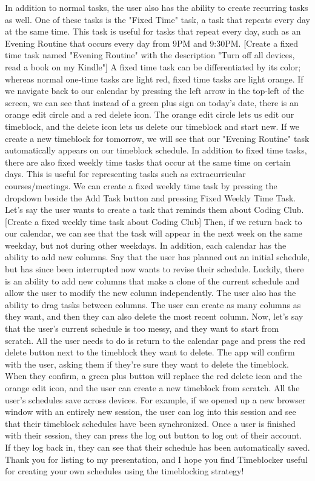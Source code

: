 \documentclass[notitlepage]{report}
\begin{document}
In addition to normal tasks, the user also has the ability to create recurring tasks as well. One of these tasks is the "Fixed Time" task, a task that repeats every day at the same time. This task is useful for tasks that repeat every day, such as an Evening Routine that occurs every day from 9PM and 9:30PM.
[Create a fixed time task named "Evening Routine" with the description "Turn off all devices, read a book on my Kindle"]
A fixed time task can be differentiated by its color; whereas normal one-time tasks are light red, fixed time tasks are light orange.
If we navigate back to our calendar by pressing the left arrow in the top-left of the screen, we can see that instead of a green plus sign on today's date, there is an orange edit circle and a red delete icon. The orange edit circle lets us edit our timeblock, and the delete icon lets us delete our timeblock and start new.
If we create a new timeblock for tomorrow, we will see that our "Evening Routine" task automatically appears on our timeblock schedule.
In addition to fixed time tasks, there are also fixed weekly time tasks that occur at the same time on certain days. This is useful for representing tasks such as extracurricular courses/meetings. We can create a fixed weekly time task by pressing the dropdown beside the Add Task button and pressing Fixed Weekly Time Task. Let's say the user wants to create a task that reminds them about Coding Club.
[Create a fixed weekly time task about Coding Club]
Then, if we return back to our calendar, we can see that the task will appear in the next week on the same weekday, but not during other weekdays.
In addition, each calendar has the ability to add new columns. Say that the user has planned out an initial schedule, but has since been interrupted now wants to revise their schedule. Luckily, there is an ability to add new columns that make a clone of the current schedule and allow the user to modify the new column independently. The user also has the ability to drag tasks between columns.
The user can create as many columns as they want, and then they can also delete the most recent column.
Now, let's say that the user's current schedule is too messy, and they want to start from scratch. All the user needs to do is return to the calendar page and press the red delete button next to the timeblock they want to delete. The app will confirm with the user, asking them if they're sure they want to delete the timeblock. When they confirm, a green plus button will replace the red delete icon and the orange edit icon, and the user can create a new timeblock from scratch.
All the user's schedules save across devices. For example, if we opened up a new browser window with an entirely new session, the user can log into this session and see that their timeblock schedules have been synchronized.
Once a user is finished with their session, they can press the log out button to log out of their account. If they log back in, they can see that their schedule has been automatically saved.
Thank you for listing to my presentation, and I hope you find Timeblocker useful for creating your own schedules using the timeblocking strategy!
\end{document}

